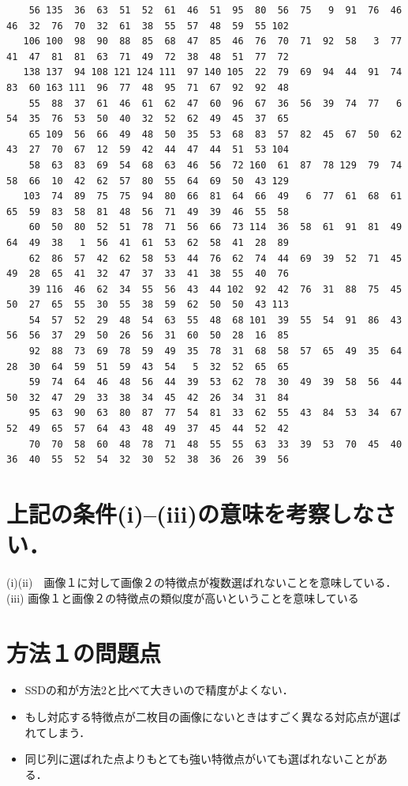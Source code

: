 \documentclass[11pt]{jarticle}
\begin{document}
\begin{verbatim}
    56 135  36  63  51  52  61  46  51  95  80  56  75   9  91  76  46  46  32  76  70  32  61  38  55  57  48  59  55 102 
   106 100  98  90  88  85  68  47  85  46  76  70  71  92  58   3  77  41  47  81  81  63  71  49  72  38  48  51  77  72 
   138 137  94 108 121 124 111  97 140 105  22  79  69  94  44  91  74  83  60 163 111  96  77  48  95  71  67  92  92  48 
    55  88  37  61  46  61  62  47  60  96  67  36  56  39  74  77   6  54  35  76  53  50  40  32  52  62  49  45  37  65 
    65 109  56  66  49  48  50  35  53  68  83  57  82  45  67  50  62  43  27  70  67  12  59  42  44  47  44  51  53 104 
    58  63  83  69  54  68  63  46  56  72 160  61  87  78 129  79  74  58  66  10  42  62  57  80  55  64  69  50  43 129 
   103  74  89  75  75  94  80  66  81  64  66  49   6  77  61  68  61  65  59  83  58  81  48  56  71  49  39  46  55  58 
    60  50  80  52  51  78  71  56  66  73 114  36  58  61  91  81  49  64  49  38   1  56  41  61  53  62  58  41  28  89 
    62  86  57  42  62  58  53  44  76  62  74  44  69  39  52  71  45  49  28  65  41  32  47  37  33  41  38  55  40  76 
    39 116  46  62  34  55  56  43  44 102  92  42  76  31  88  75  45  50  27  65  55  30  55  38  59  62  50  50  43 113 
    54  57  52  29  48  54  63  55  48  68 101  39  55  54  91  86  43  56  56  37  29  50  26  56  31  60  50  28  16  85 
    92  88  73  69  78  59  49  35  78  31  68  58  57  65  49  35  64  28  30  64  59  51  59  43  54   5  32  52  65  65 
    59  74  64  46  48  56  44  39  53  62  78  30  49  39  58  56  44  50  32  47  29  33  38  34  45  42  26  34  31  84 
    95  63  90  63  80  87  77  54  81  33  62  55  43  84  53  34  67  52  49  65  57  64  43  48  49  37  45  44  52  42 
    70  70  58  60  48  78  71  48  55  55  63  33  39  53  70  45  40  36  40  55  52  54  32  30  52  38  36  26  39  56 
\end{verbatim}
\normalsize

\section{上記の条件(i)–(iii)の意味を考察しなさい．}
(i)(ii)　画像１に対して画像２の特徴点が複数選ばれないことを意味している．
(iii) 画像１と画像２の特徴点の類似度が高いということを意味している

\section{方法１の問題点}
\begin{itemize}
    \item SSDの和が方法2と比べて大きいので精度がよくない．
    \item もし対応する特徴点が二枚目の画像にないときはすごく異なる対応点が選ばれてしまう．
    \item 同じ列に選ばれた点よりもとても強い特徴点がいても選ばれないことがある．
  \end{itemize}
\end{document}
